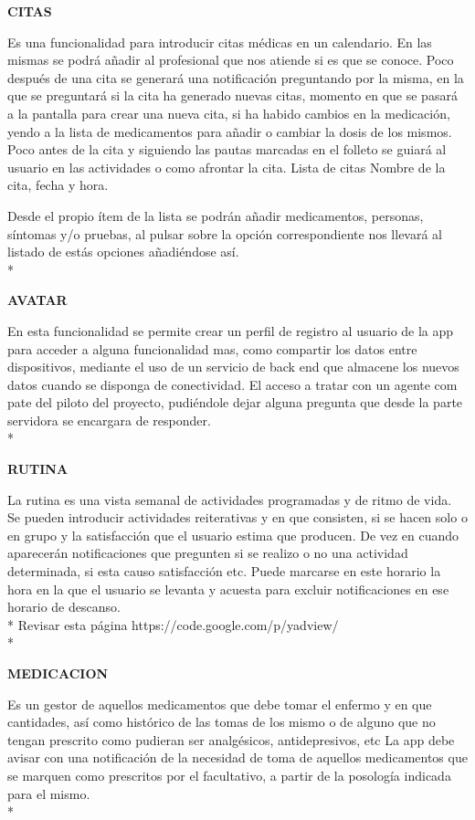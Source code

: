 \documentclass[../pfc.tex]{subfiles}
\begin{document}
	\textbf{CITAS}
	
	Es una funcionalidad para introducir citas médicas en un calendario. En las mismas se podrá añadir al profesional que nos atiende si es que se conoce. 
	Poco después de una cita se generará una notificación preguntando por la misma, en la que se preguntará si la cita ha generado nuevas citas, momento en que se pasará a la pantalla para crear una nueva cita, si ha habido cambios en la medicación, yendo a la lista de medicamentos para añadir o cambiar la dosis de los mismos.
	Poco antes de la cita y siguiendo las pautas marcadas en el folleto se guiará al usuario en las actividades o como afrontar la cita.
	Lista de citas Nombre de la cita, fecha y hora.

	Desde el propio ítem de la lista se podrán añadir medicamentos, personas, síntomas y/o pruebas, al pulsar sobre la opción correspondiente nos llevará al listado de estás opciones añadiéndose así.\\*
	
	\textbf{AVATAR}
	
	En esta funcionalidad se permite crear un perfil de registro al usuario de la app para acceder a alguna funcionalidad mas, como compartir los datos entre dispositivos, mediante el uso de un servicio de back end que almacene los nuevos datos cuando se disponga de conectividad. El acceso a tratar con un agente com pate del piloto del proyecto, pudiéndole dejar alguna pregunta que desde la parte servidora se encargara de responder.\\*

	\textbf{RUTINA}
	
	La rutina es una vista semanal de actividades programadas y de ritmo de vida. Se pueden introducir actividades reiterativas y en que consisten, si se hacen solo o en grupo y la satisfacción que el usuario estima que producen. De vez en cuando aparecerán notificaciones que pregunten si se realizo o no una actividad determinada, si esta causo satisfacción etc. Puede marcarse en este horario la hora en la que el usuario se levanta y acuesta para excluir notificaciones en ese horario de descanso. \\*
	Revisar esta página	https://code.google.com/p/yadview/\\*
		
	
	\textbf{MEDICACION}
	
	Es un gestor de aquellos medicamentos que debe tomar el enfermo y en que cantidades, así como histórico de las tomas de los mismo o de alguno que no tengan prescrito como pudieran ser analgésicos, antidepresivos, etc La app debe avisar con una notificación de la necesidad de toma de aquellos medicamentos que se marquen como prescritos por el facultativo, a partir de la posología indicada para el mismo. \\*
\end{document}
